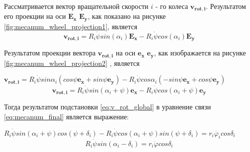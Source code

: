 \documentclass[oneside,final,14pt]{extreport}
\newcommand{\bs}{\boldsymbol}
\begin{document}
\begin{figure}[H]
\end{figure}

Рассматривается вектор вращательной скорости $i$ - го колеса $\bs{v_{rot,i}}$. Результатом его проекции на оси $\bs{E_{x}}$ $\bs{E_{y}}$, как показано на рисунке \ref{fig:mecanum_wheel_projection1}, является
\begin{equation}
\bs{v_{rot,i}}
=
R_{i}
\dot{\psi}
sin(\alpha_{i})
\bs{E_{x}}
-
R_{i}
\dot{\psi}
cos(\alpha_{i})
\bs{E_{y}}
\end{equation}

\begin{figure}[H]
\end{figure}

Результатом проекции вектора $\bs{v_{rot,i}}$ на оси $\bs{e_{x}}$ $\bs{e_{y}}$, как изображается на рисунке \ref{fig:mecanum_wheel_projection2} , является

$
\bs{v_{rot,i}}
=
R_{i}
\dot{\psi}
sin\alpha_{i}
(
cos\psi \bs{e_{x}}
+
sin\psi \bs{e_{y}}
)
-
R_{i}
\dot{\psi}
cos\alpha_{i}
(
-sin\psi \bs{e_{x}}
+
cos\psi \bs{e_{y}}
)
$
\begin{equation}
\label{eq:v_rot_global}
\bs{v_{rot,i}}
=
R_{i}
\dot{\psi}
sin(\alpha_{i} + \psi)
\bs{e_{x}}
-
R_{i}
\dot{\psi}
cos(\alpha_{i} + \psi)
\bs{e_{y}}
\end{equation}

\begin{figure}[H]
\end{figure}

Тогда результатом подстановки \ref{eq:v_rot_global} в уравнение связи \ref{eq:mecanum_final} является выражение:

$
R_{i}
\dot{\psi}
sin(\alpha_{i} + \psi)
cos(\psi + \delta_{i})
-
R_{i}
\dot{\psi}
cos(\alpha_{i} + \psi)
sin(\psi + \delta_{i})
=
r_{i}\dot{\varphi_{i}}
cos\delta_{i}
$
\begin{equation}
R_{i}
\dot{\psi}
sin(\alpha_{i} - \delta_{i})
=
r_{i}
\dot{\varphi}
cos\delta_{i}
\end{equation}
\end{document}
